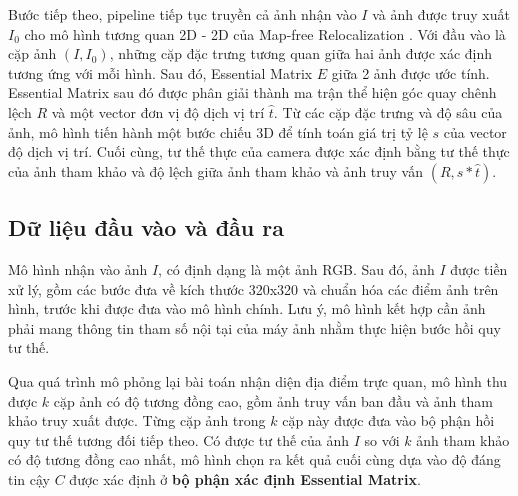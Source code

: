 Bước tiếp theo, pipeline tiếp tục truyền cả ảnh nhận vào $I$ và ảnh được truy xuất $I_0$ cho mô hình tương quan 2D - 2D của Map-free Relocalization \cite{arnold2022mapfree}. Với đầu vào là cặp ảnh $(I, I_0)$, những cặp đặc trưng tương quan giữa hai ảnh được xác định tương ứng với mỗi hình. Sau đó, Essential Matrix $E$ giữa 2 ảnh được ước tính. Essential Matrix sau đó được phân giải thành ma trận thể hiện góc quay chênh lệch $R$ và một vector đơn vị độ dịch vị trí $\hat{t}$. Từ các cặp đặc trưng và độ sâu của ảnh, mô hình tiến hành một bước chiếu 3D để tính toán giá trị tỷ lệ $s$ của vector độ dịch vị trí. Cuối cùng, tư thế thực của camera được xác định bằng tư thế thực của ảnh tham khảo và độ lệch giữa ảnh tham khảo và ảnh truy vấn $(R,s*\hat{t})$.

\subsection{Dữ liệu đầu vào và đầu ra}
Mô hình nhận vào ảnh $I$, có định dạng là một ảnh RGB. Sau đó, ảnh $I$ được tiền xử lý, gồm các bước đưa về kích thước 320x320 và chuẩn hóa các điểm ảnh trên hình, trước khi được đưa vào mô hình chính. Lưu ý, mô hình kết hợp cần ảnh phải mang thông tin tham số nội tại của máy ảnh nhằm thực hiện bước hồi quy tư thế.

Qua quá trình mô phỏng lại bài toán nhận diện địa điểm trực quan, mô hình thu được $k$ cặp ảnh có độ tương đồng cao, gồm ảnh truy vấn ban đầu và ảnh tham khảo truy xuất được. Từng cặp ảnh trong $k$ cặp này được đưa vào bộ phận hồi quy tư thế tương đối tiếp theo. Có được tư thế của ảnh $I$ so với $k$ ảnh tham khảo có độ tương đồng cao nhất, mô hình chọn ra kết quả cuối cùng dựa vào độ đáng tin cậy $C$ được xác định ở \textbf{bộ phận xác định Essential Matrix}.

